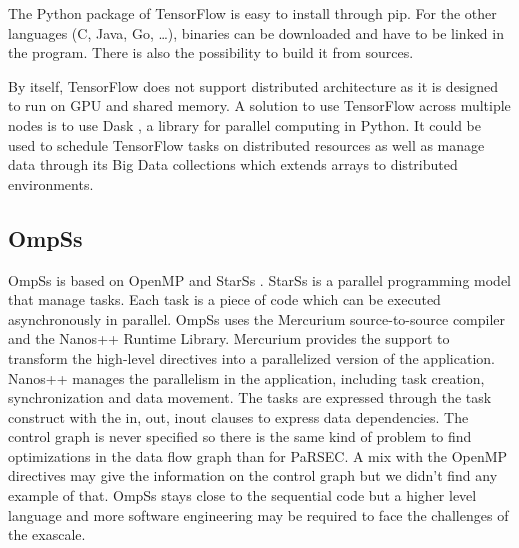 The Python package of TensorFlow is easy to install through pip.
For the other languages (C, Java, Go, \dots), binaries can be downloaded and have to be linked in the program.
There is also the possibility to build it from sources.

By itself, TensorFlow does not support distributed architecture as it is designed to run on GPU and shared memory.
A solution to use TensorFlow across multiple nodes is to use Dask \cite{Dask2016}, a library for parallel computing in Python.
It could be used to schedule TensorFlow tasks on distributed resources as well as manage data through its Big Data collections which extends arrays to distributed environments.

\subsection{OmpSs}
OmpSs \cite{DABLM2011} is based on OpenMP \cite{DaguM1998} and StarSs \cite{PerRL2007}.
StarSs is a parallel programming model that manage tasks.
Each task is a piece of code which can be executed asynchronously in parallel.
OmpSs uses the Mercurium source-to-source compiler and the Nanos++ Runtime Library.
Mercurium provides the support to transform the high-level directives into a parallelized version of the application.
Nanos++ manages the parallelism in the application, including task creation, synchronization and data movement.
The tasks are expressed through the task construct with the in, out, inout clauses to express data dependencies.
The control graph is never specified so there is the same kind of problem to find optimizations in the data flow graph than for PaRSEC.
A mix with the OpenMP directives may give the information on the control graph but we didn't find any example of that.
OmpSs stays close to the sequential code but a higher level language and more software engineering may be required to face the challenges of the exascale.


